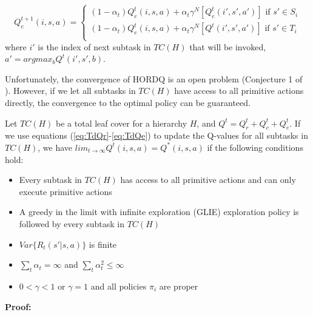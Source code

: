 \begin{equation}
    Q_e^{t+1}(i, s, a) =
    \left\{\begin{array}{ll}
    (1 - \alpha_t)Q_e^{t}(i, s, a) + \alpha_t \gamma^N[Q_e^{t}(i', s', a')]  \mbox{ if $s' \in S_i$} \\
    (1 - \alpha_t)Q_e^{t}(i, s, a) + \alpha_t \gamma^N[Q^{t}(i', s', a')]  \mbox{ if $s' \in T_i$} \\
    \end{array} \right.
    \label{eq:TdQe}
\end{equation}
where $i'$ is the index of next subtask in $TC(H)$ that will be invoked, $a' = arg max_b Q^t(i', s', b)$.

Unfortunately, the convergence of HORDQ is an open problem (Conjecture 1 of \cite{HORDQ}).
However, if we let all subtasks in $TC(H)$ have access to all primitive actions directly, 
the convergence to the optimal policy can be guaranteed. 
\begin{theorem}
    Let $TC(H)$ be a total leaf cover for a hierarchy $H$, and $Q^t = Q_r^t + Q_c^t + Q_e^t$.
    If we use equations (\ref{eq:TdQr}-\ref{eq:TdQe}) to update the Q-values for all subtasks in $TC(H)$, 
    we have $lim_{t \rightarrow \infty} Q^t(i, s, a) = Q^*(i, s, a)$
    if the following conditions hold:
    \begin{itemize}{}
    \item Every subtask in $TC(H)$ has access to all primitive actions and can only execute primitive actions
    \item A greedy in the limit with infinite exploration (GLIE) exploration policy is followed by every subtask in $TC(H)$
    \item $Var\{R_t(s' | s, a)\}$ is finite 
    \item $\sum_t \alpha_t = \infty$ and  $\sum_t \alpha_t^2 \le \infty$
    \item $0 < \gamma < 1$ or $\gamma=1$ and all policies $\pi_i$ are proper
    \end{itemize}
 
\end{theorem}
\textbf{Proof:} 
